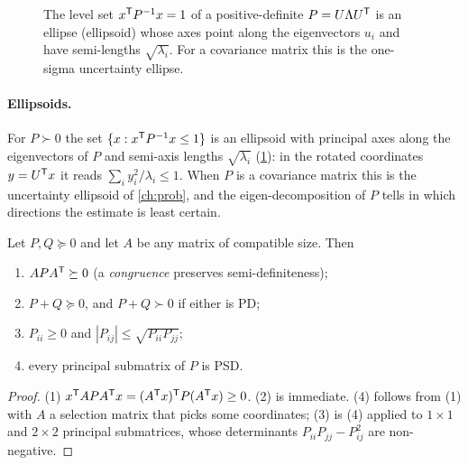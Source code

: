 \begin{figure}[t]
\centering
{}
\caption{The level set $x^{\mathsf{T}} P^{-1} x = 1$ of a positive-definite $P = U\Lambda U^{\mathsf{T}}$ is an ellipse (ellipsoid) whose axes point along the
eigenvectors $u_i$ and have semi-lengths $\sqrt{\lambda_i}$. For a covariance matrix this is the one-sigma uncertainty ellipse.}
\label{fig:ellipse}
\end{figure}

\paragraph{Ellipsoids.} For $P \succ 0$ the set $\{x : x^{\mathsf{T}} P^{-1} x \le 1\}$ is an ellipsoid with principal axes along the
eigenvectors of $P$ and semi-axis lengths $\sqrt{\lambda_i}$ (\cref{fig:ellipse}): in the rotated coordinates $y = U^{\mathsf{T}} x$ it reads
$\sum_iy_i^2/\lambda_i \le 1$. When $P$ is a covariance matrix this is the uncertainty ellipsoid of \cref{ch:prob}, and the
eigen-decomposition of $P$ tells in which directions the estimate is least certain.

\begin{proposition}
\label{prop:psd}
Let $P, Q \succeq 0$ and let $A$ be any matrix of compatible size. Then
\begin{enumerate}
  \item $A P A^{\mathsf{T}} \succeq 0$ (a \emph{congruence} preserves semi-definiteness);
  \item $P + Q \succeq 0$, and $P + Q \succ 0$ if either is PD;
  \item $P_{ii} \ge 0$ and $|P_{ij}| \le \sqrt{P_{ii} P_{jj}}$;
  \item every principal submatrix of $P$ is PSD.
\end{enumerate}
\end{proposition}
\begin{proof}
(1) $x^{\mathsf{T}} A P A^{\mathsf{T}} x = (A^{\mathsf{T}} x)^{\mathsf{T}} P (A^{\mathsf{T}} x) \ge 0$. (2) is immediate. (4) follows from (1) with $A$ a selection matrix that picks some
coordinates; (3) is (4) applied to $1\times1$ and $2\times2$ principal submatrices, whose determinants $P_{ii}P_{jj} - P_{ij}^2$ are
non-negative.
\end{proof}

